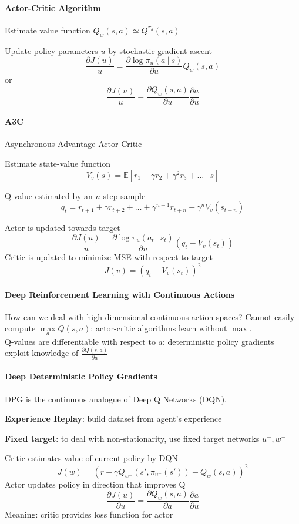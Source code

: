 \documentclass[10pt]{report}
\begin{document}
\paragraph{Actor-Critic Algorithm}
\begin{list}{}{}
	\item Estimate value function $Q_w(s,a)\simeq Q^{\pi_\theta}(s,a)$
	\item Update policy parameters $u$ by stochastic gradient ascent
	$$\frac{\partial J(u)}{u} = \frac{\partial\log\pi_u(a\:|\:s)}{\partial u}Q_w(s,a)$$
	or
	$$\frac{\partial J(u)}{u} = \frac{\partial Q_w(s,a)}{\partial u}\frac{\partial a}{\partial u}$$
\end{list}
\paragraph{A3C} Asynchronous Advantage Actor-Critic
\begin{list}{}{}
	\item Estimate state-value function
	$$V_v(s) = \mathbb{E}[r_1+\gamma r_2 + \gamma^2 r_3+\ldots\:|\:s]$$
	\item Q-value estimated by an $n$-step sample
	$$q_t = r_{t+1} + \gamma r_{t+2} + \ldots + \gamma^{n-1}r_{t+n} + \gamma^n V_v(s_{t+n})$$
	\item Actor is updated towards target
	$$\frac{\partial J(u)}{u} = \frac{\partial\log\pi_u(a_t\:|\:s_t)}{\partial u}(q_t-V_v(s_t))$$
	Critic is updated to minimize MSE with respect to target
	$$J(v) = (q_t-V_v(s_t))^2$$
\end{list}
\paragraph{Deep Reinforcement Learning with Continuous Actions} How can we deal with high-dimensional continuous action spaces? Cannot easily compute $\max\limits_a Q(s,a)$: actor-critic algorithms learn without $\max$.\\
Q-values are differentiable with respect to $a$: deterministic policy gradients exploit knowledge of $\frac{\partial Q(s,a)}{\partial a}$
\paragraph{Deep Deterministic Policy Gradients} DPG is the continuous analogue of Deep Q Networks (DQN).
\begin{list}{}{}
	\item \textbf{Experience Replay}: build dataset from agent's experience
	\item \textbf{Fixed target}: to deal with non-stationarity, use fixed target networks $u^-, w^-$
	\item Critic estimates value of current policy by DQN
	$$J(w) = \left(r+\gamma Q_{w^-}(s',\pi_{u^-}(s'))-Q_w(s,a)\right)^2$$
	Actor updates policy in direction that improves Q
	$$\frac{\partial J(u)}{\partial u}=\frac{\partial Q_w(s,a)}{\partial a}\frac{\partial a}{\partial u}$$
	Meaning: critic provides loss function for actor
\end{list}
\end{document}
